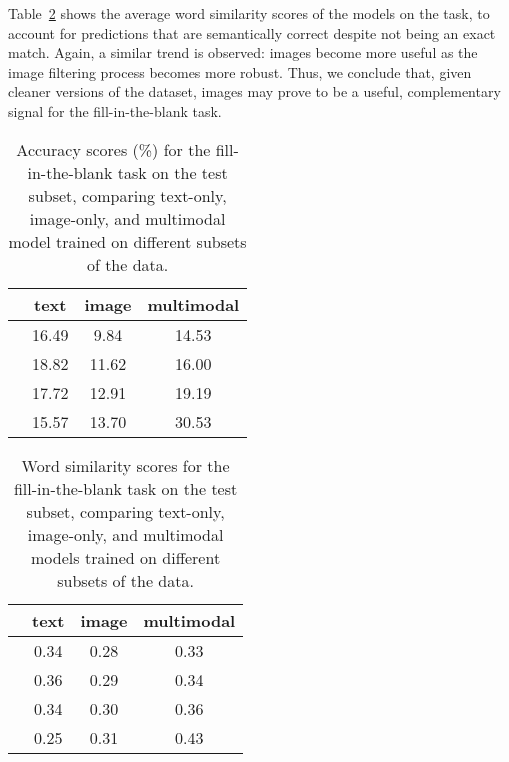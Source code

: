 \documentclass[twocolumn]{svjour3}          \smartqed  \usepackage{graphicx}
\begin{document}
Table~\ref{tbl:gapfilling-similarity} shows the average word similarity scores of the models on the task, to account for predictions that are semantically correct despite not being an exact match. Again, a similar trend is observed: images become more useful as the image filtering process becomes more robust. Thus, we conclude that, given cleaner versions of the dataset, images may prove to be a useful, complementary signal for the fill-in-the-blank task.



\begin{table}[t]
    \caption{Accuracy scores (\%) for the fill-in-the-blank task on the test subset, comparing text-only, image-only, and multimodal model  trained on different subsets of the data. }
    \label{tbl:gapfilling-accuracy}
    \centering
\begin{tabular}{c c c c}
    \toprule
    & \textbf{text} & \textbf{image} & \textbf{multimodal} \\
        \midrule
           & 16.49 & 9.84 & 14.53\\
 & 18.82 & 11.62 & 16.00\\
 & 17.72 & 12.91 & 19.19\\       
 & 15.57 & 13.70 & 30.53\\
\bottomrule
    \end{tabular}
\end{table}

\begin{table}[t]
    \caption{Word similarity scores for the fill-in-the-blank task on the test subset, comparing text-only, image-only, and multimodal models trained on different subsets of the data.}
    \label{tbl:gapfilling-similarity}
    \centering
\begin{tabular}{c c c c}
    \toprule
    & \textbf{text} & \textbf{image} & \textbf{multimodal} \\
        \midrule
  & 0.34 & 0.28 & 0.33\\
  & 0.36 & 0.29 & 0.34\\
  & 0.34 & 0.30 & 0.36\\   
  & 0.25 & 0.31 & 0.43\\
\bottomrule
    \end{tabular}
\end{table}
\end{document}

